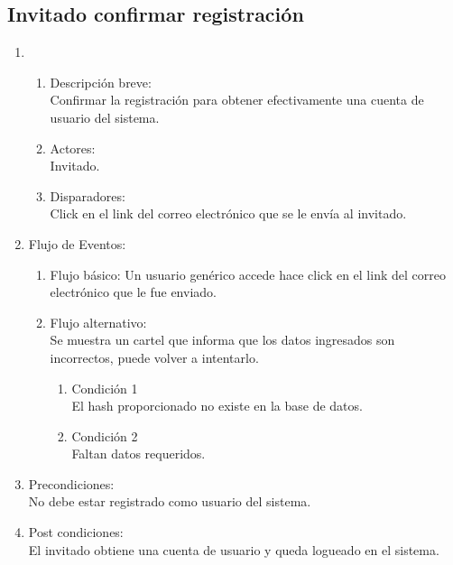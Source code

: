 \documentclass[a4paper,11pt]{article}
\begin{document}
\subsection{Invitado confirmar registraci\'on}
\begin{enumerate}

    \item
        \begin{enumerate}
            \item Descripci\'on breve: \\
                Confirmar la registraci\'on para obtener efectivamente una cuenta de usuario del sistema.
            \item Actores: \\
                Invitado.
            \item Disparadores: \\
                Click en el link del correo electr\'onico que se le env\'ia al invitado.

        \end{enumerate}

    \item Flujo de Eventos:

        \begin{enumerate}
            \item Flujo b\'asico:
                Un usuario gen\'erico accede hace click en el link del correo electr\'onico que le fue enviado.

            \item Flujo alternativo:\\
                Se muestra un cartel que informa que los datos ingresados son
                incorrectos, puede volver a intentarlo.

                \begin{enumerate}
                    \item Condici\'on 1 \\
                            El hash proporcionado no existe en la base de datos.
                    \item Condici\'on 2 \\
                            Faltan datos requeridos.
                \end{enumerate}
    \end{enumerate}

    \item Precondiciones: \\
        No debe estar registrado como usuario del sistema.

    \item Post condiciones: \\
        El invitado obtiene una cuenta de usuario y queda logueado en el sistema.

\end{enumerate}
\end{document}

